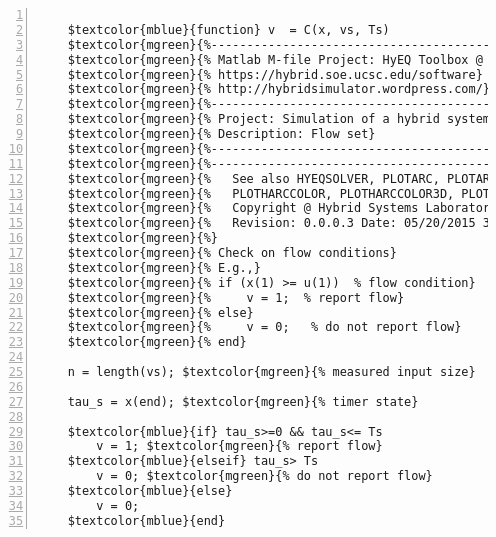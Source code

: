 %  
%  
%  
%  
  
  
\DefineShortVerb[fontfamily=courier,fontseries=m]{\$} 
\DefineShortVerb[fontfamily=courier,fontseries=b]{\#} 
  
\begin{Verbatim}[commandchars=\$\{\},numbers=left,numbersep=2pt] 

    $textcolor{mblue}{function} v  = C(x, vs, Ts)  
    $textcolor{mgreen}{%--------------------------------------------------------------------------} 
    $textcolor{mgreen}{% Matlab M-file Project: HyEQ Toolbox @  Hybrid Systems Laboratory (HSL), } 
    $textcolor{mgreen}{% https://hybrid.soe.ucsc.edu/software} 
    $textcolor{mgreen}{% http://hybridsimulator.wordpress.com/} 
    $textcolor{mgreen}{%--------------------------------------------------------------------------} 
    $textcolor{mgreen}{% Project: Simulation of a hybrid system Analog-to-Digital converter (ADC) } 
    $textcolor{mgreen}{% Description: Flow set} 
    $textcolor{mgreen}{%--------------------------------------------------------------------------} 
    $textcolor{mgreen}{%--------------------------------------------------------------------------} 
    $textcolor{mgreen}{%   See also HYEQSOLVER, PLOTARC, PLOTARC3, PLOTFLOWS, PLOTHARC,} 
    $textcolor{mgreen}{%   PLOTHARCCOLOR, PLOTHARCCOLOR3D, PLOTHYBRIDARC, PLOTJUMPS.} 
    $textcolor{mgreen}{%   Copyright @ Hybrid Systems Laboratory (HSL),} 
    $textcolor{mgreen}{%   Revision: 0.0.0.3 Date: 05/20/2015 3:42:00} 
    $textcolor{mgreen}{%} 
    $textcolor{mgreen}{% Check on flow conditions} 
    $textcolor{mgreen}{% E.g.,} 
    $textcolor{mgreen}{% if (x(1) >= u(1))  % flow condition} 
    $textcolor{mgreen}{%     v = 1;  % report flow} 
    $textcolor{mgreen}{% else} 
    $textcolor{mgreen}{%     v = 0;   % do not report flow} 
    $textcolor{mgreen}{% end} 
     
    n = length(vs); $textcolor{mgreen}{% measured input size} 
     
    tau_s = x(end); $textcolor{mgreen}{% timer state} 
     
    $textcolor{mblue}{if} tau_s>=0 && tau_s<= Ts 
        v = 1; $textcolor{mgreen}{% report flow} 
    $textcolor{mblue}{elseif} tau_s> Ts 
        v = 0; $textcolor{mgreen}{% do not report flow} 
    $textcolor{mblue}{else} 
        v = 0; 
    $textcolor{mblue}{end}  
\end{Verbatim}  
  
\UndefineShortVerb{\$} 
\UndefineShortVerb{\#} 
 